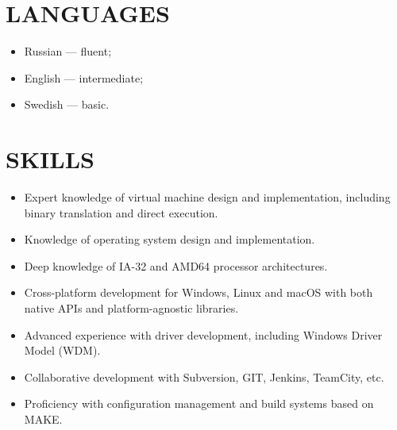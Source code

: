 ﻿\documentclass[12pt, a4paper, oneside]{article}
\begin{document}
\section*{LANGUAGES}

\begin{itemize}
\item Russian --- fluent;
\item English --- intermediate;
\item Swedish --- basic.
\end{itemize}

\section*{SKILLS}

\begin{itemize}
\item Expert knowledge of virtual machine design and implementation,
  including binary translation and direct execution.
\item Knowledge of operating system design and implementation.
\item Deep knowledge of IA-32 and AMD64 processor architectures.
\item Cross-platform development for Windows, Linux and macOS with both native
  APIs and platform-agnostic libraries.
\item Advanced experience with driver development, including Windows Driver
  Model (WDM).
\item Collaborative development with Subversion, GIT, Jenkins, TeamCity, etc.
\item Proficiency with configuration management and build systems based on MAKE.
\end{itemize}

\nocite{dvcon-lzcnt}
\nocite{en-t-cet}
\printbibliography[title={PUBLICATIONS}]
\end{document}
